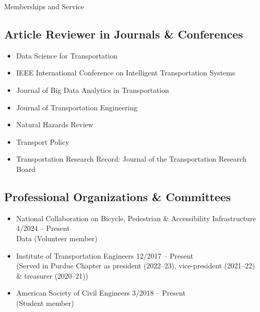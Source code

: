 \documentclass{CV} %
\begin{document}
\begin{rSection}{Memberships and Service}
    \subsection*{Article Reviewer in Journals \& Conferences}
    \begin{itemize}
        \item Data Science for Transportation
        \item IEEE International Conference on Intelligent Transportation Systems
        \item Journal of Big Data Analytics in Transportation
        \item Journal of Transportation Engineering
        \item Natural Hazards Review
        \item Transport Policy
        \item Transportation Research Record: Journal of the Transportation Research Board
    \end{itemize}
    \subsection*{Professional Organizations \& Committees}
    \begin{itemize}
        \item National Collaboration on Bicycle, Pedestrian \& Accessibility Infrastructure \hfill 4/2024 – Present \\
        Data (Volunteer member)
        \item Institute of Transportation Engineers \hfill 12/2017 – Present \\
        (Served in Purdue Chapter as president (2022–23), vice-president (2021–22) \& treasurer (2020–21))
        \item American Society of Civil Engineers \hfill 3/2018 – Present
        \\ (Student member)
    \end{itemize}

\end{rSection}
\end{document}

